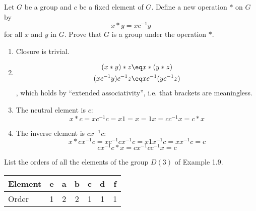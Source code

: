 \begin{exercise}
    Let \(G\) be a group and \(c\) be a fixed element of \(G\). Define a new operation \(*\) on \(G\) by
    \[x * y = xc^{ - 1}y\]
    for all \(x\) and \(y\) in \(G\). Prove that \(G\) is a group under the operation \(*\).
\end{exercise}
\begin{solution}\itemfix
    \begin{enumerate}
        \item Closure is trivial.
        \item \begin{align*}
                  (x * y) * z     & \eq x * (y * z)     \\
                  (xc^{ - 1}y) c^{ - 1} z & \eq xc^{ - 1} (yc^{ - 1} z) \\
              \end{align*}
              , which holds by ``extended associativity'', i.e. that brackets are meaningless.
        \item The neutral element is \(c\):
         \[x * c = x c^{ - 1}c = x 1 = x = 1 x = c c^{ - 1} x = c * x\]
        \item The inverse element is \(c x^{ - 1} c\):
         \[x * c x^{ - 1} c = x c^{ - 1} c x^{ - 1} c = x 1 x^{ - 1} c = x x^{ - 1} c = c\]
         \[c x^{ - 1} c * x = c x^{ - 1} c c^{ - 1} x = c\]
    \end{enumerate}
\end{solution}

\begin{exercise}
    List the orders of all the elements of the group \(D(3)\) of Example 1.9.
\end{exercise}
\begin{solution}\itemfix
    \begin{center}
        \begin{tabular}{l|C|C|C|C|C|C}
            Element & e & a & b & c & d & f \\ \hline
            Order   & 1 & 2 & 2 & 1 & 1 & 1
        \end{tabular}
    \end{center}
\end{solution}
